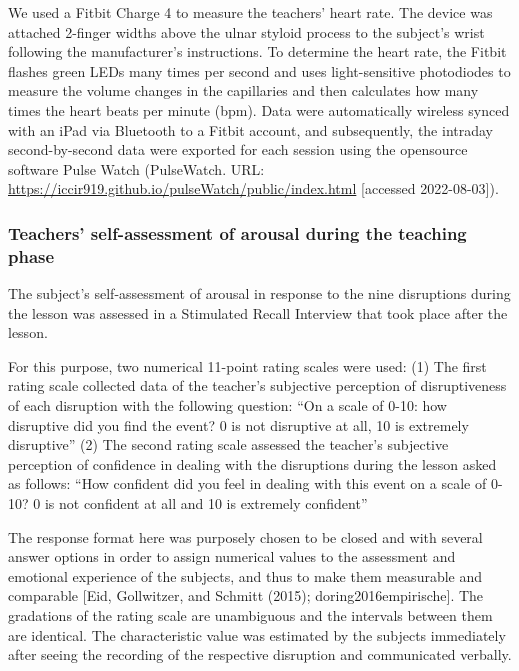\documentclass[
  man]{apa6}
\begin{document}
We used a Fitbit Charge 4 to measure the teachers' heart rate. The device was attached 2-finger widths above the ulnar styloid process to the subject's wrist following the manufacturer's instructions. To determine the heart rate, the Fitbit flashes green LEDs many times per second and uses light-sensitive photodiodes to measure the volume changes in the capillaries and then calculates how many times the heart beats per minute (bpm). Data were automatically wireless synced with an iPad via Bluetooth to a Fitbit account, and subsequently, the intraday second-by-second data were exported for each session using the opensource software Pulse Watch (PulseWatch. URL: \url{https://iccir919.github.io/pulseWatch/public/index.html} {[}accessed 2022-08-03{]}).

\hypertarget{teachers-self-assessment-of-arousal-during-the-teaching-phase}{%
\subsubsection{Teachers' self-assessment of arousal during the teaching phase}\label{teachers-self-assessment-of-arousal-during-the-teaching-phase}}

The subject's self-assessment of arousal in response to the nine disruptions during the lesson was assessed in a Stimulated Recall Interview that took place after the lesson.

For this purpose, two numerical 11-point rating scales were used:
(1) The first rating scale collected data of the teacher's subjective perception of disruptiveness of each disruption with the following question: ``On a scale of 0-10: how disruptive did you find the event? 0 is not disruptive at all, 10 is extremely disruptive''
(2) The second rating scale assessed the teacher's subjective perception of confidence in dealing with the disruptions during the lesson asked as follows: ``How confident did you feel in dealing with this event on a scale of 0-10? 0 is not confident at all and 10 is extremely confident''

The response format here was purposely chosen to be closed and with several answer options in order to assign numerical values to the assessment and emotional experience of the subjects, and thus to make them measurable and comparable {[}Eid, Gollwitzer, and Schmitt (2015); doring2016empirische{]}. The gradations of the rating scale are unambiguous and the intervals between them are identical. The characteristic value was estimated by the subjects immediately after seeing the recording of the respective disruption and communicated verbally.
\end{document}
